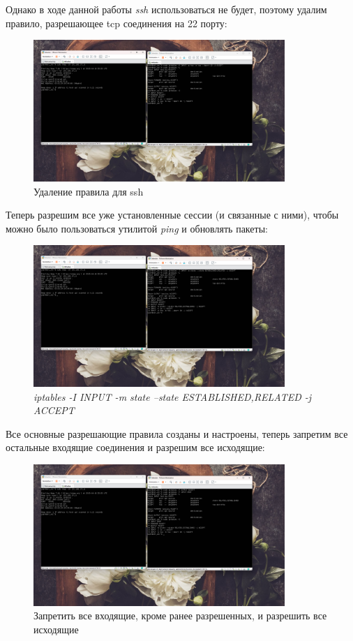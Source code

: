 \documentclass[a4paper]{article}
\begin{document}
  Однако в ходе данной работы \textit{ssh} использоваться не будет, поэтому 
  удалим правило, разрешающее tcp соединения на 22 порту:

  \begin{figure}[H]
    \centering
    \includegraphics[width=0.85\textwidth]{03_00 (44)}
    \caption{Удаление правила для ssh}
    \label{img:44}
  \end{figure}


  Теперь разрешим все уже установленные сессии (и связанные с ними), чтобы
  можно было пользоваться утилитой \textit{ping} и обновлять пакеты:
  
  \begin{figure}[H]
    \centering
    \includegraphics[width=0.85\textwidth]{03_00 (45)}
    \caption{\textit{iptables -I INPUT -m state --state ESTABLISHED,RELATED -j ACCEPT}}
    \label{img:45}
  \end{figure}

  Все основные разрешающие правила созданы и настроены, теперь запретим все остальные входящие 
  соединения и разрешим все исходящие:

  \begin{figure}[H]
    \centering
    \includegraphics[width=0.85\textwidth]{03_00 (46)}
    \caption{Запретить все входящие, кроме ранее разрешенных, и разрешить все исходящие}
    \label{img:46}
  \end{figure}
\end{document}
